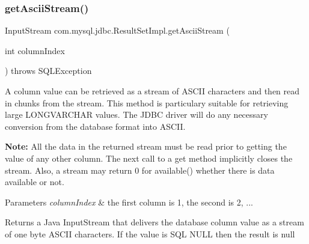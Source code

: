 \subsubsection{\texorpdfstring{get\+Ascii\+Stream()}{getAsciiStream()}\hspace{0.1cm}{\footnotesize\ttfamily [1/2]}}
{\footnotesize\ttfamily Input\+Stream com.\+mysql.\+jdbc.\+Result\+Set\+Impl.\+get\+Ascii\+Stream (\begin{DoxyParamCaption}\item[{int}]{column\+Index }\end{DoxyParamCaption}) throws S\+Q\+L\+Exception}

A column value can be retrieved as a stream of A\+S\+C\+II characters and then read in chunks from the stream. This method is particulary suitable for retrieving large L\+O\+N\+G\+V\+A\+R\+C\+H\+AR values. The J\+D\+BC driver will do any necessary conversion from the database format into A\+S\+C\+II.

{\bfseries Note\+:} All the data in the returned stream must be read prior to getting the value of any other column. The next call to a get method implicitly closes the stream. Also, a stream may return 0 for available() whether there is data available or not. 


\begin{DoxyParams}{Parameters}
{\em column\+Index} & the first column is 1, the second is 2, ...\\
\hline
\end{DoxyParams}
\begin{DoxyReturn}{Returns}
a Java Input\+Stream that delivers the database column value as a stream of one byte A\+S\+C\+II characters. If the value is S\+QL N\+U\+LL then the result is null
\end{DoxyReturn}

